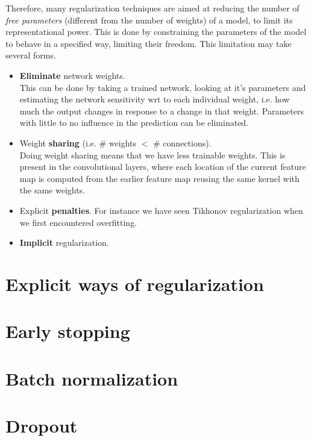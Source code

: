 Therefore, many regularization techniques are aimed at reducing the number of \emph{free parameters} (different from the number of weights) of a model, to limit its representational power. This is done by constraining the parameters of the model to behave in a specified way, limiting their freedom. This limitation may take several forms.

\begin{itemize}
    \item \textbf{Eliminate} network weights.\\
    This can be done by taking a trained network, looking at it's parameters and estimating the network sensitivity wrt to each individual weight, i.e. how much the output changes in response to a change in that weight. Parameters with little to no influence in the prediction can be eliminated.
    
    \item Weight \textbf{sharing} (i.e. \# weights $<$ \# connections). \\
    Doing weight sharing means that we have less trainable weights. This is present in the convolutional layers, where each location of the current feature map is computed from the earlier feature map reusing the same kernel with the same weights.

    \item Explicit \textbf{penalties}. For instance we have seen Tikhonov regularization when we first encountered overfitting.

    \item \textbf{Implicit} regularization.
\end{itemize}

\section{Explicit ways of regularization} 

\section{Early stopping} 

\section{Batch normalization} 

\section{Dropout} 

